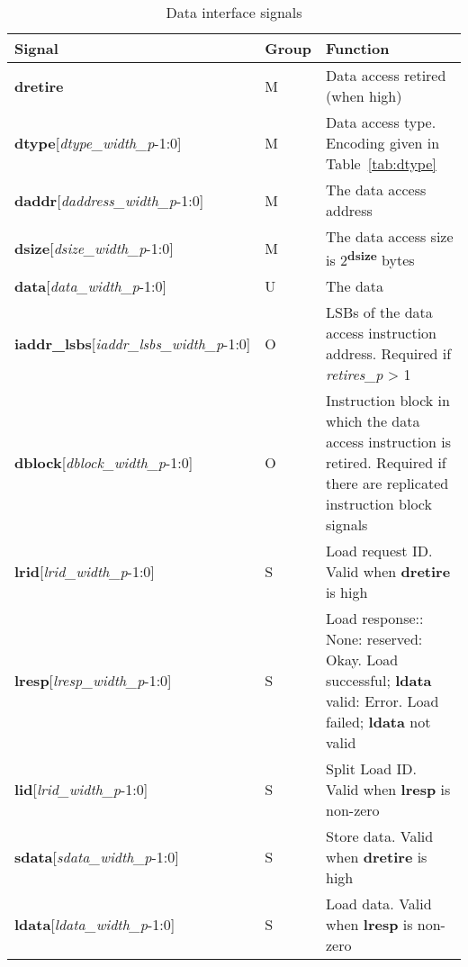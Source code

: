 \begin{table}[htp]
    \centering
    \caption{Data interface signals}
    \label{tab:data-ingress}
    \begin{tabulary}{\textwidth}{|l|l|p{80mm}|}
        \hline
        \textbf{Signal} & \textbf{Group} & \textbf{Function} \\
        \hline
        \textbf{dretire} & M & Data access retired (when high)\\
        \hline
        \textbf{dtype}[\textit{dtype\_width\_p}-1:0] & M & Data access type.  Encoding given in Table~\ref{tab:dtype}\\
        \hline
        \textbf{daddr}[\textit{daddress\_width\_p}-1:0] & M & The data access address\\
        \hline
        \textbf{dsize}[\textit{dsize\_width\_p}-1:0] & M & The data access size is 2\textsuperscript{\textbf{dsize}} bytes\\
        \hline
        \textbf{data}[\textit{data\_width\_p}-1:0] & U & The data\\
        \hline
        \textbf{iaddr\_lsbs}[\textit{iaddr\_lsbs\_width\_p}-1:0] & O & LSBs of the data access instruction address.  Required if \textit{retires\_p} > 1\\
        \hline
        \textbf{dblock}[\textit{dblock\_width\_p}-1:0] & O & Instruction block in which the data access instruction is retired.  Required if there 
          are replicated instruction block signals\\
        \hline
        \textbf{lrid}[\textit{lrid\_width\_p}-1:0] & S & Load request ID. Valid when \textbf{dretire} is high\\
        \hline        
        \textbf{lresp}[\textit{lresp\_width\_p}-1:0] & S & Load response:: None: reserved: Okay.  Load successful; \textbf{ldata} valid: Error. Load failed; \textbf{ldata} not valid\\
        \hline        
        \textbf{lid}[\textit{lrid\_width\_p}-1:0] & S & Split Load ID. Valid when \textbf{lresp} is non-zero\\
        \hline        
        \textbf{sdata}[\textit{sdata\_width\_p}-1:0] & S & Store data. Valid when \textbf{dretire} is high\\
        \hline        
        \textbf{ldata}[\textit{ldata\_width\_p}-1:0] & S & Load data. Valid when \textbf{lresp} is non-zero\\
        \hline        
    \end{tabulary}
\end{table}

